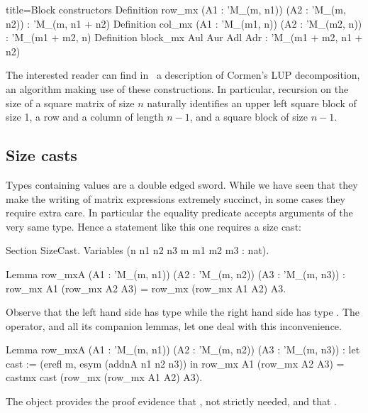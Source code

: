 \begin{coq}{}{title=Block constructors}
Definition row_mx (A1 : 'M_(m, n1)) (A2 : 'M_(m, n2)) : 'M_(m, n1 + n2)
Definition col_mx (A1 : 'M_(m1, n)) (A2 : 'M_(m2, n)) : 'M_(m1 + m2, n)
Definition block_mx Aul Aur Adl Adr : 'M_(m1 + m2, n1 + n2)
\end{coq}

The interested reader can find in~\cite{packedclasses}
a description of Cormen's LUP decomposition, an algorithm
making use of these constructions.  In particular, recursion
on the size of a square matrix of size $n$ naturally identifies
an upper left square block of size 1, a row and a column of length $n-1$,
and a square block of size $n-1$.

\subsection{Size casts}\label{sec:castmx}

\warntechnical{}

Types containing values are a double edged sword.  While we have seen that
they make the writing of matrix expressions extremely succinct, in
some cases
they require extra care.  In particular the equality predicate accepts
arguments of the very same type.  Hence a statement like this one
requires a size cast:

\begin{coq}{}{}
Section SizeCast.
Variables (n n1 n2 n3 m m1 m2 m3 : nat).

Lemma row_mxA (A1 : 'M_(m, n1)) (A2 : 'M_(m, n2)) (A3 : 'M_(m, n3)) :
  row_mx A1 (row_mx A2 A3) = row_mx (row_mx A1 A2) A3.
\end{coq}

Observe that the left hand side has type  while
the right hand side has type .  The
 operator, and all its companion lemmas, let one deal with
this inconvenience.

\begin{coq}{}{}
Lemma row_mxA (A1 : 'M_(m, n1)) (A2 : 'M_(m, n2)) (A3 : 'M_(m, n3)) :
  let cast := (erefl m, esym (addnA n1 n2 n3)) in
  row_mx A1 (row_mx A2 A3) = castmx cast (row_mx (row_mx A1 A2) A3).
\end{coq}
The  object provides the proof evidence that , not
strictly needed, and that .

